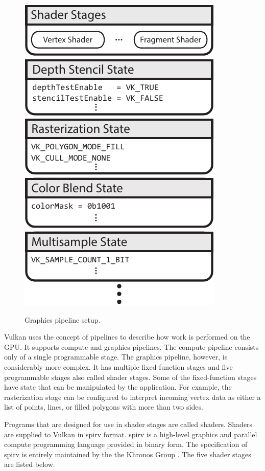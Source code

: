     \begin{figure}
      \caption{Graphics pipeline setup.}
      \centering
      \includegraphics{Main/Images/GraphicsPipeline}
      \label{fig:GraphicsPipeline}
    \end{figure}

    Vulkan uses the concept of pipelines to describe how work is performed on the GPU. It supports compute and graphics pipelines. The compute pipeline consists only of a single programmable stage. The graphics pipeline, however, is considerably more complex. It has multiple fixed function stages and five programmable stages also called shader stages. Some of the fixed-function stages have state that can be manipulated by the \gls{application}. For example, the rasterization stage can be configured to interpret incoming vertex data as either a list of points, lines, or filled polygons with more than two sides.

    Programs that are designed for use in shader stages are called shaders. Shaders are supplied to Vulkan in \gls{spirv} format. \gls{spirv} is a high-level graphics and parallel compute programming language provided in binary form. The specification of \gls{spirv} is entirely maintained by the the Khronos Group \cite{spirvspecprov}. The five shader stages are listed below.


